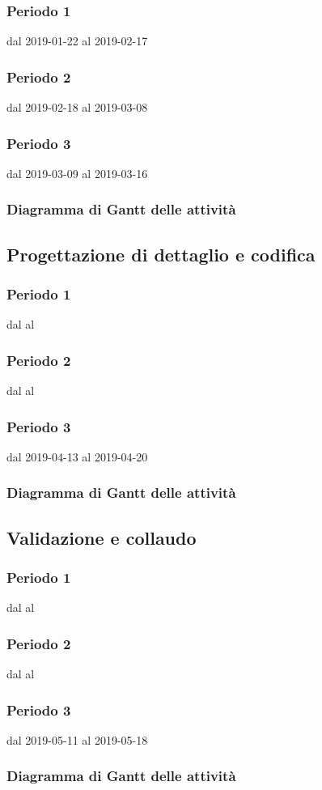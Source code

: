 \subsubsection{Periodo 1} dal 2019-01-22 al 2019-02-17
\subsubsection{Periodo 2} dal 2019-02-18 al 2019-03-08
\subsubsection{Periodo 3} dal 2019-03-09 al 2019-03-16
\subsubsection{Diagramma di Gantt delle attività}


\subsection{Progettazione di dettaglio e codifica}

\subsubsection{Periodo 1} dal al
\subsubsection{Periodo 2} dal al
\subsubsection{Periodo 3} dal 2019-04-13 al 2019-04-20
\subsubsection{Diagramma di Gantt delle attività}


\subsection{Validazione e collaudo}

\subsubsection{Periodo 1} dal al
\subsubsection{Periodo 2} dal al
\subsubsection{Periodo 3} dal 2019-05-11 al 2019-05-18
\subsubsection{Diagramma di Gantt delle attività}